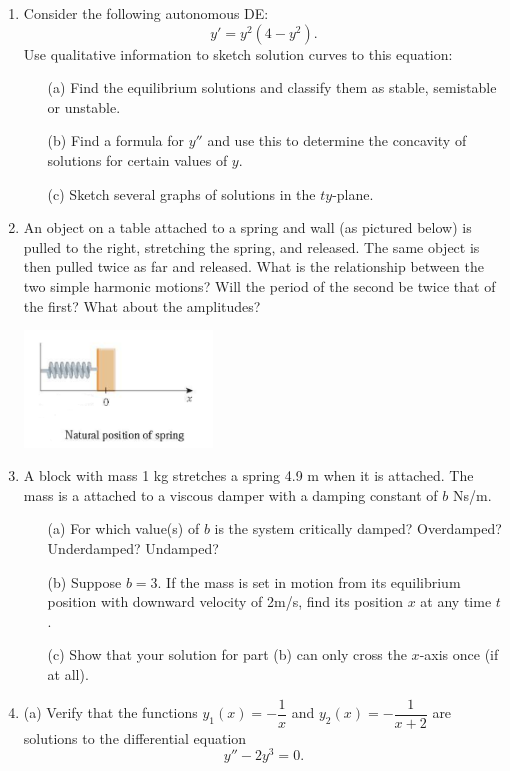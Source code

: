 \documentclass[12pt]{article}
\begin{document}
\begin{enumerate}
\item Consider the following autonomous DE:
$$ y' = y^2(4-y^2).$$
Use qualitative information to sketch solution curves to this equation:
\begin{itemize}
\item[(a)] Find the equilibrium solutions and classify them as stable, semistable or unstable.
\item[(b)] Find a formula for $y''$ and use this to determine the concavity of solutions for certain values of $y$.
\item[(c)] Sketch several graphs of solutions in the $ty$-plane.
\end{itemize}

\item An object on a table attached to a spring and wall (as pictured below) is pulled to the right, stretching the spring, and released.  The same object is then pulled twice as far and released.  What is the relationship between the two simple harmonic motions?  Will the period of the second be twice that of the first?  What about the amplitudes?

\begin{center}
\includegraphics[width= 50mm]{spring1.png}
\end{center}


 
 \item A block with mass 1 kg stretches a spring 4.9 m when it is attached.  The mass is a attached to a viscous damper with a damping constant of $b$ Ns/m.  
\begin{itemize} 
\item[(a)] For which value(s) of $b$ is the system critically damped? Overdamped? Underdamped? Undamped?
\item[(b)] Suppose $b=3$.  If the mass is set in motion from its equilibrium position with downward velocity of 2m/s, find its position $x$ at any time $t$.
\item[(c)] Show that your solution for part (b) can only cross the $x$-axis once (if at all).
\end{itemize}

\item (a) Verify that the functions $y_1(x) = -\dfrac{1}{x}$ and $y_2(x) = -\dfrac{1}{x+2}$ are solutions to the differential equation
\begin{equation}
\label{nonlin}
y'' - 2y^3 = 0.
\end{equation}


\end{enumerate}
\end{document}
